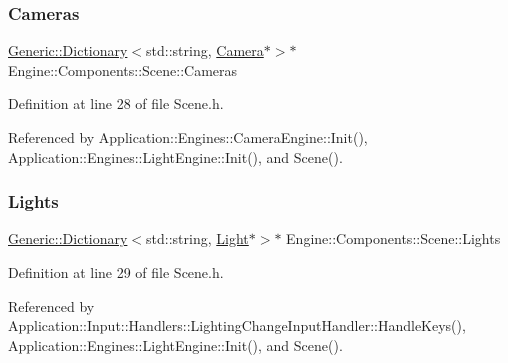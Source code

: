 \mbox{\label{classEngine_1_1Components_1_1Scene_aea98ff1ced88ee859878b504e9a2a362}} 
\subsubsection{\texorpdfstring{Cameras}{Cameras}}
{\footnotesize\ttfamily \mbox{\hyperlink{classGeneric_1_1Dictionary}{Generic\+::\+Dictionary}}$<$std\+::string, \mbox{\hyperlink{classEngine_1_1Components_1_1Camera}{Camera}}$\ast$$>$$\ast$ Engine\+::\+Components\+::\+Scene\+::\+Cameras}



Definition at line 28 of file Scene.\+h.



Referenced by Application\+::\+Engines\+::\+Camera\+Engine\+::\+Init(), Application\+::\+Engines\+::\+Light\+Engine\+::\+Init(), and Scene().

\mbox{\label{classEngine_1_1Components_1_1Scene_a00f60de2f6c72242a7af0076a3b75e5e}} 
\subsubsection{\texorpdfstring{Lights}{Lights}}
{\footnotesize\ttfamily \mbox{\hyperlink{classGeneric_1_1Dictionary}{Generic\+::\+Dictionary}}$<$std\+::string, \mbox{\hyperlink{classLight}{Light}}$\ast$$>$$\ast$ Engine\+::\+Components\+::\+Scene\+::\+Lights}



Definition at line 29 of file Scene.\+h.



Referenced by Application\+::\+Input\+::\+Handlers\+::\+Lighting\+Change\+Input\+Handler\+::\+Handle\+Keys(), Application\+::\+Engines\+::\+Light\+Engine\+::\+Init(), and Scene().

\mbox{\label{classEngine_1_1Components_1_1Scene_ae828757eea5410550f6674421051a783}} 
